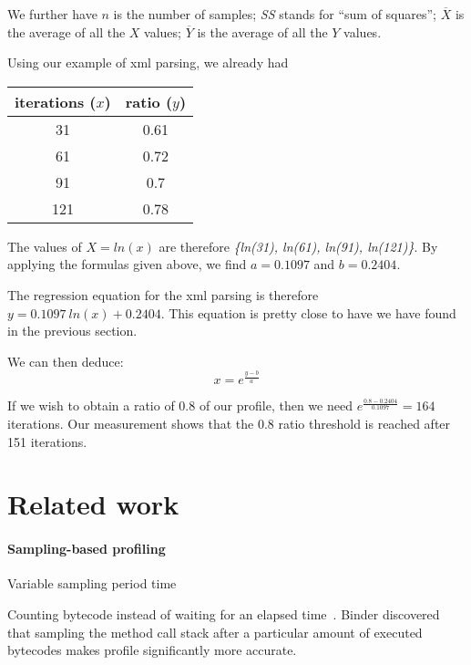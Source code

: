 \documentclass{sig-alternate}
\newcommand{\seclabel}[1]{\label{sec:#1}}
\begin{document}
We further have $n$ is the number of samples; 
\textit{SS} stands for ``sum of squares'';
$\overline{X}$ is the average of all the $X$ values;
$\overline{Y}$ is the average of all the $Y$ values.

Using our example of xml parsing, we already had 

\begin{center}
\begin{tabular}{|c|c|}
\hline
iterations ($x$) & ratio ($y$) \\\hline
31		& 0.61 \\
61		& 0.72\\
91		& 0.7\\
121		& 0.78\\
\hline
\end{tabular}
\end{center}

The values of $X = ln(x)$ are therefore \textit{\{ln(31), ln(61), ln(91), ln(121)\}}.
By applying the formulas given above, we find $a = 0.1097$ and $b = 0.2404$. 

The regression equation for the xml parsing is therefore $y = 0.1097~ln(x) + 0.2404$. This equation is pretty close to have we have found in the previous section.

We can then deduce:
\[
x = e^{\frac{y-b}{a}}
\]

If we wish to obtain a ratio of 0.8 of our profile, then we need $e^{\frac{0.8 - 0.2404}{0.1097}} = 164$ iterations. Our measurement shows that the 0.8 ratio threshold is reached after 151 iterations.



\section{Related work}\seclabel{relatedwork}

\paragraph{Sampling-based profiling}

Variable sampling period time~\cite{Mytk10a}

Counting bytecode instead of waiting for an elapsed time~\cite{Bind06a}.
Binder discovered that sampling the method call stack after a particular amount of executed bytecodes makes profile significantly more accurate.
\end{document}
